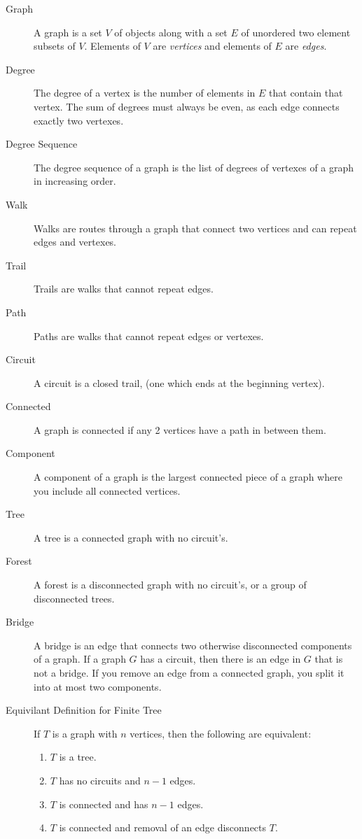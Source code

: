 \documentclass[../main.tex]{subfiles}
\begin{document}
\begin{description}
  \item[Graph] A graph is a set $V$ of objects along with a set $E$ of
    unordered two element subsets of $V$. Elements of $V$ are
    \textit{vertices} and elements of $E$ are \textit{edges}.
  \item[Degree] The degree of a vertex is the number of elements in $E$ that
    contain that vertex. The sum of degrees must always be even, as each edge
    connects exactly two vertexes.
  \item[Degree Sequence] The degree sequence of a graph is the list of degrees
    of vertexes of a graph in increasing order.
  \item[Walk] Walks are routes through a graph that connect two vertices and can repeat
    edges and vertexes.
  \item[Trail] Trails are walks that cannot repeat edges.
  \item[Path] Paths are walks that cannot repeat edges or vertexes.
  \item[Circuit] A circuit is a closed trail, (one which ends at the beginning
    vertex).
  \item[Connected] A graph is connected if any 2 vertices have a path in
    between them.
  \item[Component] A component of a graph is the largest connected piece of a
    graph where you include all connected vertices.
  \item[Tree] A tree is a connected graph with no circuit's.
  \item[Forest] A forest is a disconnected graph with no circuit's, or a group
    of disconnected trees.
  \item[Bridge] A bridge is an edge that connects two otherwise disconnected
    components of a graph. If a graph $G$ has a circuit, then there is an edge
    in $G$ that is not a bridge. If you remove an edge from a connected graph,
    you split it into at most two components.
  \item[Equivilant Definition for Finite Tree] If $T$ is a graph with $n$
    vertices, then the following are equivalent:
    \begin{enumerate}[(1)]
      \item $T$ is a tree.
      \item $T$ has no circuits and $n-1$ edges.
      \item $T$ is connected and has $n-1$ edges.
      \item $T$ is connected and removal of an edge disconnects $T$.

\end{enumerate}
\end{description}
\end{document}
